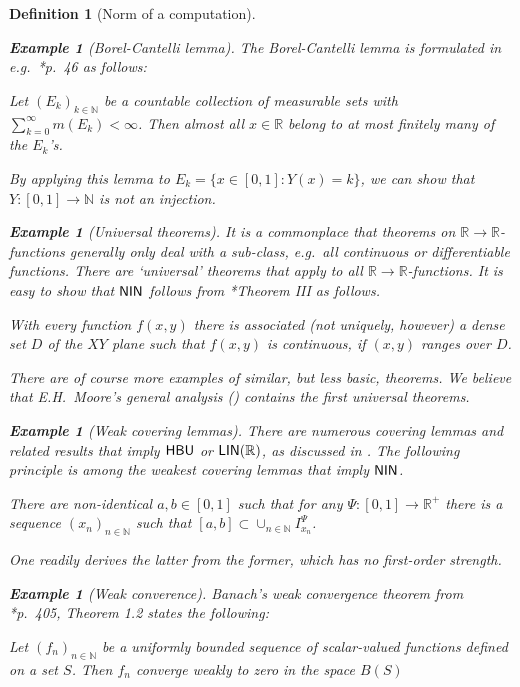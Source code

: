 \documentclass[reqno]{amsart}
\newtheorem{defi}[thm]{Definition}
\newtheorem{exa}[thm]{Example}
\def\({\textup{(}}
\def\){\textup{)}}
\def\N{{\mathbb  N}}
\def\R{{\mathbb  R}}
\def\di{\rightarrow}
\def\HBU{\textup{\textsf{HBU}}}
\def\NIN{\textup{\textsf{NIN}}}
\def\LIN{\textup{\textsf{LIN}}}
\numberwithin{equation}{section}
\numberwithin{thm}{section}
\begin{document}
\begin{defi}[Norm of a computation]
\begin{exa}[Borel-Cantelli lemma]\rm
The Borel-Cantelli lemma is formulated in e.g.\ \cite{fitzro}*{p.\ 46} as follows:  
\begin{center}
\emph{Let $(E_{k})_{k\in \N}$ be a countable collection of measurable sets with $\sum_{k=0}^{\infty} m( E_{k}) <\infty$. Then almost all $x\in \R$ belong to at most finitely many of the $E_{k}$'s.}
\end{center}
By applying this lemma to $E_{k}=\{x\in [0, 1]: Y(x)=k\}$, we can show that $Y:[0,1]\di \N$ is not an injection. 
\end{exa}
\begin{exa}[Universal theorems]\rm
It is a commonplace that theorems on $\R\di \R$-functions generally only deal with a \emph{sub-class}, e.g.\ all continuous or differentiable functions.   
There are `universal' theorems that apply to \emph{all} $\R\di \R$-functions.
It is easy to show that $\NIN$ follows from \cite{bloemeken}*{Theorem III} as follows.
\begin{center}
\emph{With every function $f( x, y )$ there is associated \(not uniquely, however\) a dense set $D$ of the $XY$ plane such that $f(x, y)$ is continuous, if $(x, y)$ ranges over $D$.}
\end{center}
There are of course more examples of similar, but less basic, theorems.  We believe that E.H.\ Moore's \emph{general analysis} (\cite{moorelimit1, mooreICM}) contains the \emph{first} universal theorems. 
\end{exa}
\begin{exa}[Weak covering lemmas]\rm
There are numerous covering lemmas and related results that imply $\HBU$ or $\LIN(\R)$, as discussed in \cite{dagsamIII}.
The following principle is among the weakest covering lemmas that imply $\NIN$.
\begin{center}
\emph{There are non-identical $a, b\in [0,1]$ such that for any $\Psi:[0,1]\di \R^{+}$ there is a sequence $(x_{n})_{n\in \N}$ such that $[a,b]\subset \cup_{n\in \N}I_{x_{n}}^{\Psi}$.}
\end{center}
One readily derives the latter from the former, which has no first-order strength. 
\end{exa}
\begin{exa}[Weak converence]\rm
Banach's weak convergence theorem from \cite{dies}*{p.\ 405, Theorem 1.2} states the following:
\begin{center}
\emph{Let $(f_{n})_{n\in \N}$ be a uniformly bounded sequence of scalar-valued
functions defined on a set $S$. Then $f_{n}$ converge weakly to zero in the space $B(S)$
}
\end{center}
\end{exa}
\end{defi}
\end{document}

